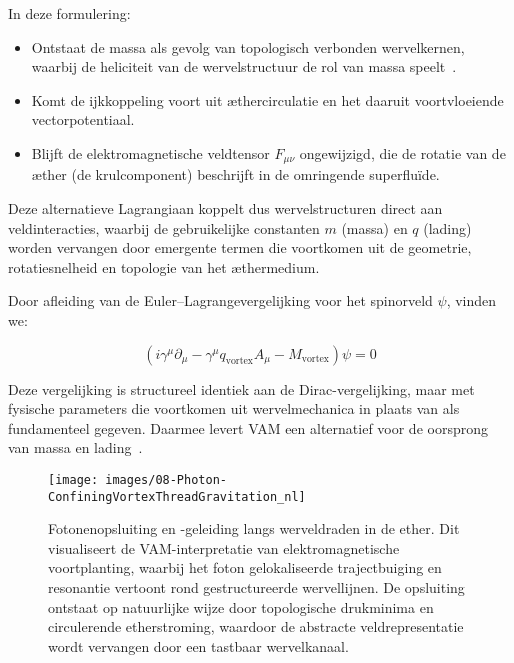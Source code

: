 In deze formulering:

\begin{itemize}
    \item Ontstaat de massa als gevolg van topologisch verbonden wervelkernen, waarbij de heliciteit van de wervelstructuur de rol van massa speelt~\cite{volovik2003}.
    \item Komt de ijkkoppeling voort uit æthercirculatie en het daaruit voortvloeiende vectorpotentiaal.
    \item Blijft de elektromagnetische veldtensor \( F_{\mu\nu} \) ongewijzigd, die de rotatie van de æther (de krulcomponent) beschrijft in de omringende superfluïde.
\end{itemize}

Deze alternatieve Lagrangiaan koppelt dus wervelstructuren direct aan veldinteracties, waarbij de gebruikelijke constanten \( m \) (massa) en \( q \) (lading) worden vervangen door emergente termen die voortkomen uit de geometrie, rotatiesnelheid en topologie van het æthermedium.

Door afleiding van de Euler–Lagrangevergelijking voor het spinorveld \( \psi \), vinden we:

\begin{equation}
    \boxed{ \left( i \gamma^\mu \partial_\mu - \gamma^\mu q_\text{vortex} A_\mu - M_\text{vortex} \right)\psi = 0 }
\end{equation}

Deze vergelijking is structureel identiek aan de Dirac-vergelijking, maar met fysische parameters die voortkomen uit wervelmechanica in plaats van als fundamenteel gegeven. Daarmee levert VAM een alternatief voor de oorsprong van massa en lading~\cite{Barcelo2011, volovik2003}.

\begin{figure}[H]
    \centering
    \texttt{[image: images/08-Photon-ConfiningVortexThreadGravitation\_nl]}
    \caption{Fotonenopsluiting en -geleiding langs werveldraden in de ether. Dit visualiseert de VAM-interpretatie van elektromagnetische voortplanting, waarbij het foton gelokaliseerde trajectbuiging en resonantie vertoont rond gestructureerde wervellijnen. De opsluiting ontstaat op natuurlijke wijze door topologische drukminima en circulerende etherstroming, waardoor de abstracte veldrepresentatie wordt vervangen door een tastbaar wervelkanaal.}
    \label{fig:photon_confine}
\end{figure}